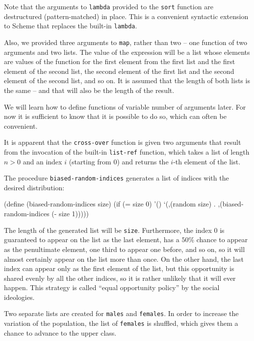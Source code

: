 Note that the arguments to \texttt{lambda} provided to the \texttt{sort}
function are destructured (pattern-matched) in place. This is a convenient
syntactic extension to Scheme that replaces the built-in \texttt{lambda}.

Also, we provided three arguments to \texttt{map}, rather than two
-- one function of two arguments and two lists. The value of the expression
will be a list whose elements are values of the function for the first element
from the first list and the first element of the second list, the
second element of the first list and the second element of the second
list, and so on. It is assumed that the length of both lists is the
same -- and that will also be the length of the result.

We will learn how to define functions of variable number of arguments
later. For now it is sufficient to know that it is possible to do so,
which can often be convenient.

It is apparent that the \texttt{cross-over} function is given two
arguments that result from the invocation of the built-in \texttt{list-ref}
function, which takes a list of length $n>0$ and an index $i$ (starting
from $0$) and returns the $i$-th element of the list.

The procedure \texttt{biased-random-indices} generates a list of
indices with the desired distribution:

\begin{Snippet}
(define (biased-random-indices size)
  (if (= size 0)
      '()
      `(,(random size) . ,(biased-random-indices (- size 1)))))
\end{Snippet}

The length of the generated list will be \texttt{size}.
Furthermore, the index $0$ is guaranteed to appear on the list
as the last element, has a $50\%$ chance to appear as the
penultimate element, one third to appear one before, and so
on, so it will almost certainly appear on the list more than
once. On the other hand, the last index can appear only
as the first element of the list, but this opportunity
is shared evenly by all the other indices, so it is rather
unlikely that it will ever happen. This strategy is called
``equal opportunity policy'' by the social ideologies.

Two separate lists are created for \texttt{males}
and \texttt{females}. In order to increase the variation
of the population, the list of \texttt{females} is shuffled,
which gives them a chance to advance to the upper class.

